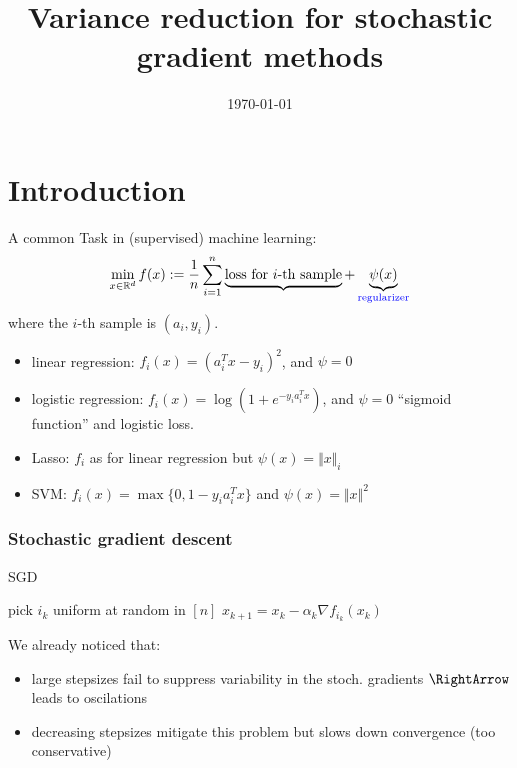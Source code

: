 \documentclass{beamer}
\title{Variance reduction for stochastic gradient methods}
\date{\today}
\begin{document}
\maketitle
\frame{\tableofcontents[currentsection]}

\section{Introduction}%


A common Task in (supervised) machine learning:
\begin{equation}
  \min_{x\in \mathbb{R}^d} f(x) := \frac{1}{n} \sum_{i=1}^{n} \underbrace{\text{loss for $i$-th sample}} + \underbrace{\psi(x)}_{\textcolor{blue}{\text{regularizer}}}
\end{equation}
where the $i$-th sample is $(a_i, y_i)$.

\begin{itemize}
  \item linear regression: $f_i(x) = {(a_i^T x -y_i)}^2$, and $\psi=0$
  \item logistic regression: $f_i(x) = \log(1+e^{-y_i a_i^T x})$, and $\psi=0$
        ``sigmoid function'' and logistic loss.
  \item Lasso: $f_i$ as for linear regression but $\psi(x) = \Vert x \Vert_i$
  \item SVM: $f_i(x) = \max \{0 , 1 - y_i a_i^T x\}$ and $\psi(x)= \Vert x \Vert^2$
\end{itemize}


\begin{frame}
  \frametitle{Stochastic gradient descent}
  \begin{algorithm}
    \caption{SGD}\label{euclid}
    \begin{algorithmic}[1]
      \State pick $i_k$ uniform at random in $[n]$
      \State $x_{k+1} = x_k  - \alpha_k \nabla f_{i_k}(x_k)$
      \Endfor
    \end{algorithmic}
  \end{algorithm}

  We already noticed that:
  \begin{itemize}
    \item large stepsizes fail to suppress variability in the stoch. gradients $\RightArrow$ leads to oscilations
    \item decreasing stepsizes mitigate this problem but slows down convergence (too conservative)
  \end{itemize}

\end{frame}
\end{document}
